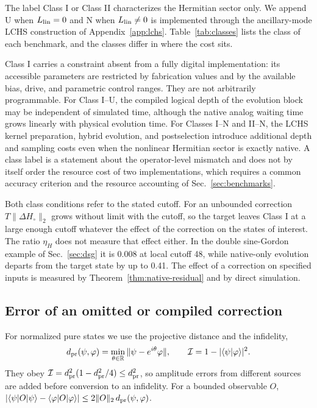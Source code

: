 \documentclass[pra,twocolumn,superscriptaddress,nofootinbib,floatfix]{revtex4-2}
\theoremstyle{remark}
\newcommand{\dpr}{d_{\rm pr}}
\newcommand{\revcolor}{\color{blue}}
\DeclareRobustCommand{\rev}[1]{{\revcolor #1}}
\begin{document}
The label Class I or Class II characterizes the Hermitian sector only. \rev{We append U when $L_{\rm lin}=0$ and N when $L_{\rm lin}\neq0$ is implemented through the ancillary-mode LCHS construction of Appendix~\ref{app:lchs}.} \rev{Table~\ref{tab:classes} lists the class of each benchmark, and the classes differ in where the cost sits.}

Class I carries a constraint absent from a fully digital implementation: its accessible parameters are restricted by fabrication values and by the available bias, drive, and parametric control ranges. They are not arbitrarily programmable. For Class I--U, the compiled logical depth of the evolution block may be independent of simulated time, although the native analog waiting time grows linearly with physical evolution time. For Classes I--N and II--N, the LCHS kernel preparation, hybrid evolution, and postselection introduce additional depth and sampling costs even when the nonlinear Hermitian sector is exactly native. \rev{A class label is a statement about the operator-level mismatch and does not by itself order the resource cost of two implementations, which requires a common accuracy criterion and the resource accounting of Sec.~\ref{sec:benchmarks}.}

\rev{Both class conditions refer to the stated cutoff.} \rev{For an unbounded correction \(T\|\Delta H_\circ\|_2\) grows without limit with the cutoff, so the target leaves Class I at a large enough cutoff whatever the effect of the correction on the states of interest.} \rev{The ratio \(\eta_H\) does not measure that effect either.} \rev{In the double sine-Gordon example of Sec.~\ref{sec:dsg} it is 0.008 at local cutoff 48, while native-only evolution departs from the target state by up to 0.41.} \rev{The effect of a correction on specified inputs is measured by Theorem~\ref{thm:native-residual} and by direct simulation.}

\subsection{\rev{Error of an omitted or compiled correction}}
\label{subsec:error-bounds}

\rev{For normalized pure states we use the projective distance and the infidelity,}
\begingroup\revcolor
\begin{align}
\dpr(\psi,\varphi)=\min_{\theta\in\mathbb R}\|\psi-e^{i\theta}\varphi\|,\qquad \mathcal I=1-|\langle\psi|\varphi\rangle|^2 .
\label{eq:metrics}
\end{align}
\endgroup
\rev{They obey \(\mathcal I=\dpr^2(1-\dpr^2/4)\le\dpr^2\), so amplitude errors from different sources are added before conversion to an infidelity.} \rev{For a bounded observable \(O\), \(|\langle\psi|O|\psi\rangle-\langle\varphi|O|\varphi\rangle|\le2\|O\|_2\,\dpr(\psi,\varphi)\).}
\end{document}
